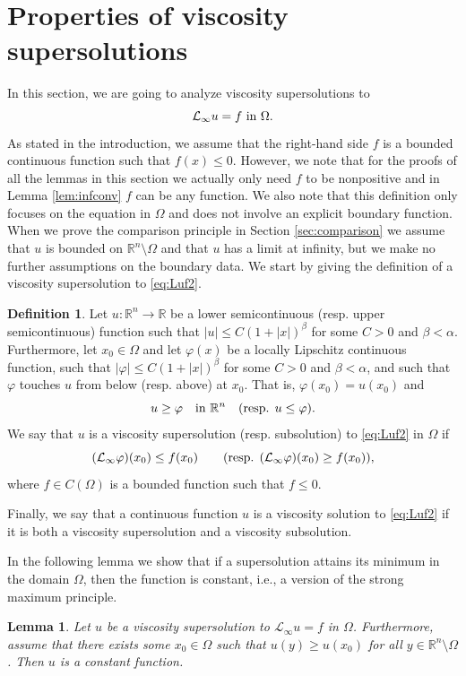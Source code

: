 \documentclass[11pt]{article}
\newcommand{\R}{\mathbb{R}}
\providecommand{\Linf}{\mathcal{L}_{\infty}}
\providecommand{\Rn}{\mathbb{R}^n}
\newtheorem{lem}[thm]{Lemma}
\numberwithin{equation}{section}
\theoremstyle{definition}
\newtheorem{definition}{Definition}[section]
\begin{document}
\section{Properties of viscosity supersolutions}
\label{sec:supersol}
In this section, we are going to analyze viscosity supersolutions to 
\begin{equation}\label{eq:Luf2}   
\Linf u=f  \textup{ in }  \Omega.
\end{equation}
As stated in the introduction, we assume that the right-hand side $f$ is a bounded continuous function such that $f(x) \leq 0$. However, we note that for the proofs of all the lemmas in this section we actually only need $f$ to be nonpositive and in Lemma \ref{lem:infconv} $f$ can be any function. We also note that this definition only focuses on the equation in $\Omega$ and does not involve an explicit boundary function. When we prove the comparison principle in Section \ref{sec:comparison} we assume that $u$ is bounded on $\Rn \setminus \Omega$ and that $u$ has a limit at infinity, but we make no further assumptions on the boundary data. We start by giving the definition of a viscosity supersolution to \eqref{eq:Luf2}.

\begin{definition} \label{def:viscositySol}
Let $u : \R^n \to \R$ be a lower semicontinuous (resp. upper semicontinuous) function such that $|u| \leq C(1+|x|)^{\beta}$ for some $C> 0$ and $\beta < \alpha$. Furthermore, let $x_0 \in \Omega$ and let $\varphi(x)$ be a locally Lipschitz continuous function, such that $|\varphi| \leq C(1+|x|)^{\beta}$ for some $C> 0$ and $\beta < \alpha$, and such that $\varphi$ touches $u$ from below (resp. above) at $x_0$. That is,  $\varphi(x_0)=u(x_0)$ and 
     $$
     u \geq \varphi \quad \textup{in } \Rn \quad(\textup{resp. } u \leq \varphi).
     $$
   We say that $u$ is a viscosity supersolution (resp. subsolution) to \eqref{eq:Luf2} in $\Omega$ if 
    $$
    (\Linf \varphi)(x_0) \leq f(x_0) \qquad (\textup{resp. }(\Linf \varphi)(x_0) \geq f(x_0)),
    $$
where $f \in C(\Omega)$ is a bounded function such that $f \leq 0$. 

Finally, we say that a continuous function $u$ is a viscosity solution to \eqref{eq:Luf2} if it is both a viscosity supersolution and a viscosity subsolution.
\end{definition}

 In the following lemma we show that if a supersolution attains its minimum in the domain $\Omega$, then the function is constant, i.e., a version of the strong maximum principle.
\begin{lem}
\label{lem:strongmaxprinc}
   Let $u$ be a viscosity supersolution to $\Linf u = f$ in $\Omega$. Furthermore, assume that there exists some $x_0 \in \Omega$ such that $u(y) \geq u(x_0)$ for all $y \in \Rn \setminus \Omega$. Then $u$ is a constant function.
\end{lem}
\end{document}
